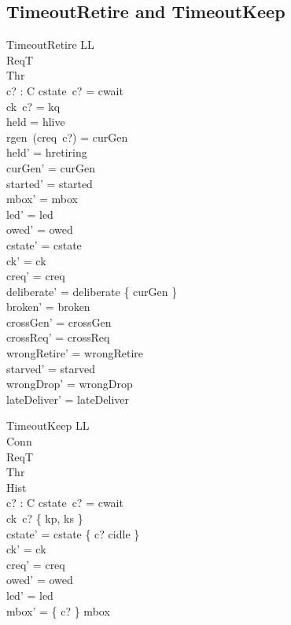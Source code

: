 \documentclass[a4paper,10pt,fleqn]{article}
\begin{document}
\subsection{TimeoutRetire and TimeoutKeep}

\begin{schema}{TimeoutRetire}
  \Delta LL \\
  \Xi ReqT \\
  \Xi Thr \\
  c? : C
\where
  cstate~c? = cwait \\
  ck~c? = kq \\
  held = hlive \\
  rgen~(creq~c?) = curGen \\
  held' = hretiring \\
  curGen' = curGen \\
  started' = started \\
  mbox' = mbox \\
  led' = led \\
  owed' = owed \\
  cstate' = cstate \\
  ck' = ck \\
  creq' = creq \\
  deliberate' = deliberate \cup \{ curGen \} \\
  broken' = broken \\
  crossGen' = crossGen \\
  crossReq' = crossReq \\
  wrongRetire' = wrongRetire \\
  starved' = starved \\
  wrongDrop' = wrongDrop \\
  lateDeliver' = lateDeliver
\end{schema}

\begin{schema}{TimeoutKeep}
  \Delta LL \\
  \Xi Conn \\
  \Xi ReqT \\
  \Xi Thr \\
  \Xi Hist \\
  c? : C
\where
  cstate~c? = cwait \\
  ck~c? \in \{ kp, ks \} \\
  cstate' = cstate \oplus \{ c? \mapsto cidle \} \\
  ck' = ck \\
  creq' = creq \\
  owed' = owed \\
  led' = led \\
  mbox' = \{ c? \} \ndres mbox
\end{schema}
\end{document}
